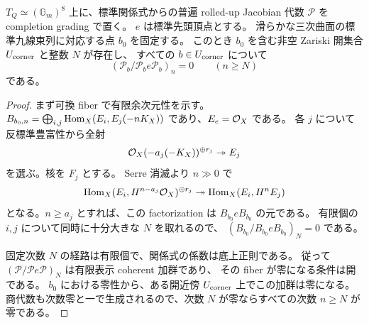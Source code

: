 \begin{proposition}
\label{prop:aou-corner-open}
$T_Q\simeq(\mathbb G_m)^8$ 上に、標準関係式からの普遍 rolled-up Jacobian 代数
$\mathscr P$ を completion grading で置く。
$e$ は標準先頭頂点とする。
滑らかな三次曲面の標準九線束列に対応する点 $b_0$ を固定する。
このとき $b_0$ を含む非空 Zariski 開集合 $U_{\rm corner}$ と整数 $N$ が存在し、
すべての $b\in U_{\rm corner}$ について
\[
 (\mathscr P_b/\mathscr P_be\mathscr P_b)_n=0\qquad(n\ge N)
\]
である。
\end{proposition}
\begin{proof}
まず可換 fiber で有限余次元性を示す。
$B_{b_0,n}=\bigoplus_{i,j}\operatorname{Hom}_X(E_i,E_j(-nK_X))$ であり、$E_e=\mathcal O_X$ である。
各 $j$ について反標準豊富性から全射
\[
 \mathcal O_X(-a_j(-K_X))^{\oplus r_j}\twoheadrightarrow E_j
\]
を選ぶ。核を $F_j$ とする。
Serre 消滅より $n\gg0$ で
\[
 \operatorname{Hom}_X(E_i,H^{n-a_j}\mathcal O_X)^{\oplus r_j}
 \twoheadrightarrow\operatorname{Hom}_X(E_i,H^nE_j)
\]
となる。$n\ge a_j$ とすれば、この factorization は $B_{b_0}eB_{b_0}$ の元である。
有限個の $i,j$ について同時に十分大きな $N$ を取れるので、
$(B_{b_0}/B_{b_0}eB_{b_0})_N=0$ である。

固定次数 $N$ の経路は有限個で、関係式の係数は底上正則である。
従って $(\mathscr P/\mathscr Pe\mathscr P)_N$ は有限表示 coherent 加群であり、
その fiber が零になる条件は開である。
$b_0$ における零性から、ある開近傍 $U_{\rm corner}$ 上でこの加群は零になる。
商代数も次数零と一で生成されるので、次数 $N$ が零ならすべての次数 $n\ge N$ が零である。
\end{proof}

